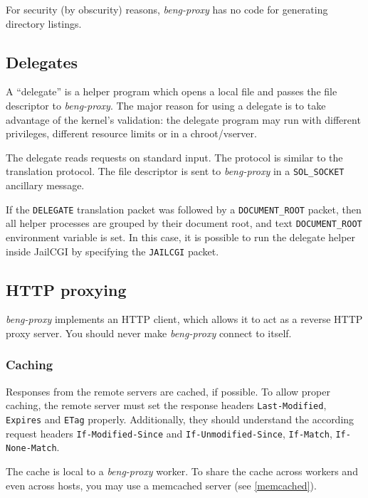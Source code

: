 \documentclass[a4paper,12pt]{article}
\begin{document}
For security (by obscurity) reasons, \emph{beng-proxy} has no code for
generating directory listings.

\subsection{Delegates}
\label{delegate}

A ``delegate'' is a helper program which opens a local file and passes
the file descriptor to \emph{beng-proxy}.  The major reason for using
a delegate is to take advantage of the kernel's validation: the
delegate program may run with different privileges, different resource
limits or in a chroot/vserver.

The delegate reads requests on standard input.  The protocol is
similar to the translation protocol.  The file descriptor is sent to
\emph{beng-proxy} in a \texttt{SOL\_SOCKET} ancillary message.

If the \texttt{DELEGATE} translation packet was followed by a
\texttt{DOCUMENT\_ROOT} packet, then all helper processes are grouped
by their document root, and text \texttt{DOCUMENT\_ROOT} environment
variable is set.  In this case, it is possible to run the delegate
helper inside JailCGI by specifying the \texttt{JAILCGI} packet.

\subsection{HTTP proxying}
\label{http}

\emph{beng-proxy} implements an HTTP client, which allows it to act as
a reverse HTTP proxy server.  You should never make \emph{beng-proxy}
connect to itself.

\subsubsection{Caching}
\label{caching}

Responses from the remote servers are cached, if possible.  To allow
proper caching, the remote server must set the response headers
\texttt{Last-Modified}, \texttt{Expires} and \texttt{ETag} properly.
Additionally, they should understand the according request headers
\texttt{If-Modified-Since} and \texttt{If-Unmodified-Since},
\texttt{If-Match}, \texttt{If-None-Match}.

The cache is local to a \emph{beng-proxy} worker.  To share the cache
across workers and even across hosts, you may use a memcached server
(see \ref{memcached}).
\end{document}
